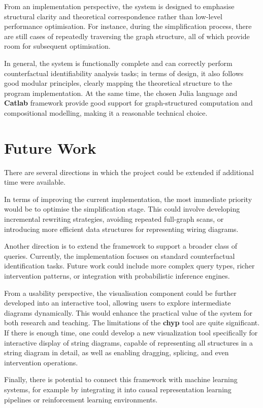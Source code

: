\documentclass[a4paper]{report}
\begin{document}
From an implementation perspective, the system is designed to emphasise structural clarity and theoretical correspondence rather than low-level performance optimisation. For instance, during the simplification process, there are still cases of repeatedly traversing the graph structure, all of which provide room for subsequent optimisation.

In general, the system is functionally complete and can correctly perform counterfactual identifiability analysis tasks; in terms of design, it also follows good modular principles, clearly mapping the theoretical structure to the program implementation. At the same time, the chosen Julia language and \textbf{Catlab} framework provide good support for graph-structured computation and compositional modelling, making it a reasonable technical choice.

\section{Future Work}
There are several directions in which the project could be extended if additional time were available.

In terms of improving the current implementation, the most immediate priority would be to optimise the simplification stage. This could involve developing incremental rewriting 
strategies, avoiding repeated full-graph scans, or introducing more efficient data structures for representing wiring diagrams.

Another direction is to extend the framework to support a broader class of queries. Currently, the implementation focuses on standard counterfactual identification tasks. Future work could include more complex query types, richer intervention patterns, or integration with probabilistic inference engines.

From a usability perspective, the visualisation component could be further developed into an interactive tool, allowing users to explore intermediate diagrams dynamically. This would enhance the practical value of the system for both research and teaching.
The limitations of the \textbf{chyp} tool are quite significant. If there is enough time, one could develop a new visualization tool specifically for interactive display of string diagrams, capable of representing all structures in a string diagram in detail, as well as enabling dragging, splicing, and even intervention operations.

Finally, there is potential to connect this framework with machine learning systems, for example by integrating it into causal representation learning pipelines or reinforcement learning environments.
\end{document}
